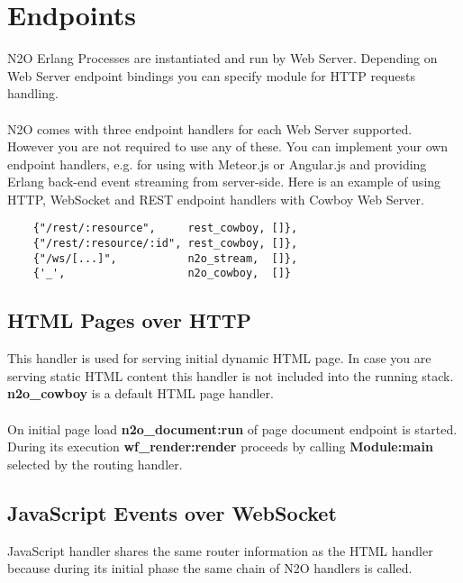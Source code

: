 \section{Endpoints}
N2O Erlang Processes are instantiated and run by Web Server.
Depending on Web Server endpoint bindings you can specify
module for HTTP requests handling.

\paragraph{}
N2O comes with three endpoint handlers for each Web Server supported.
However you are not required to use any of these.
You can implement your own endpoint handlers, e.g. for using with
Meteor.js or Angular.js and providing Erlang back-end event streaming
from server-side. Here is an example of using HTTP, WebSocket and
REST endpoint handlers with Cowboy Web Server.

\vspace{1\baselineskip}
\begin{lstlisting}
    {"/rest/:resource",     rest_cowboy, []},
    {"/rest/:resource/:id", rest_cowboy, []},
    {"/ws/[...]",           n2o_stream,  []},
    {'_',                   n2o_cowboy,  []}
\end{lstlisting}

\subsection{HTML Pages over HTTP}
This handler is used for serving initial dynamic HTML page.
In case you are serving static HTML content this handler is
not included into the running stack. {\bf {n2o}\_{cowboy}} is
a default HTML page handler.

\paragraph{}
On initial page load {\bf {n2o}\_{document}:run} of page document endpoint is started.
During its execution {\bf {wf}\_{render}:render} proceeds
by calling {\bf Module:main} selected by the routing handler.

\newpage
\subsection{JavaScript Events over WebSocket}
JavaScript handler shares the same router information as the
HTML handler because during its initial phase the same chain
of N2O handlers is called.

